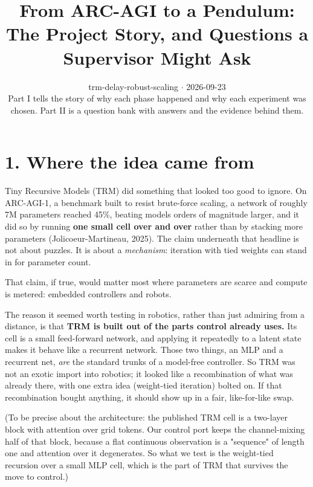 \documentclass[11pt]{article}
\title{From ARC-AGI to a Pendulum: The Project Story, and Questions a Supervisor Might Ask}
\author{}
\date{trm-delay-robust-scaling $\cdot$ 2026-09-23\\[2pt]Part I tells the story of why each phase happened and why each experiment was chosen. Part II is a question bank with answers and the evidence behind them.}
\begin{document}
\maketitle
\tableofcontents
\clearpage



\medskip{}



\section*{1. Where the idea came from}



Tiny Recursive Models (TRM) did something that looked too good to ignore. On ARC-AGI-1, a benchmark built to resist brute-force scaling, a network of roughly 7M parameters reached 45\%, beating models orders of magnitude larger, and it did so by running \textbf{one small cell over and over} rather than by stacking more parameters (Jolicoeur-Martineau, 2025). The claim underneath that headline is not about puzzles. It is about a \emph{mechanism}: iteration with tied weights can stand in for parameter count.



That claim, if true, would matter most where parameters are scarce and compute is metered: embedded controllers and robots.



The reason it seemed worth testing in robotics, rather than just admiring from a distance, is that \textbf{TRM is built out of the parts control already uses.} Its cell is a small feed-forward network, and applying it repeatedly to a latent state makes it behave like a recurrent network. Those two things, an MLP and a recurrent net, \emph{are} the standard trunks of a model-free controller. So TRM was not an exotic import into robotics; it looked like a recombination of what was already there, with one extra idea (weight-tied iteration) bolted on. If that recombination bought anything, it should show up in a fair, like-for-like swap.



(To be precise about the architecture: the published TRM cell is a two-layer block with attention over grid tokens. Our control port keeps the channel-mixing half of that block, because a flat continuous observation is a "sequence" of length one and attention over it degenerates. So what we test is the weight-tied recursion over a small MLP cell, which is the part of TRM that survives the move to control.)
\end{document}
